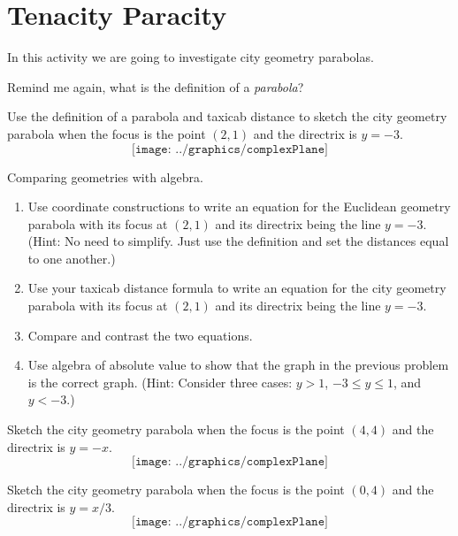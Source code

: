 \newpage
\section{Tenacity Paracity}
In this activity we are going to investigate city geometry parabolas.

\begin{prob} 
Remind me again, what is the definition of a \textit{parabola}?
\end{prob}
\vspace{0.5in}

\begin{prob}
Use the definition of a parabola and taxicab distance to sketch the city geometry parabola when the focus is the point $(2,1)$
and the directrix is $y=-3$. 
\[
\texttt{[image: ../graphics/complexPlane]}
\]
\end{prob}

\break
\begin{prob}
Comparing geometries with algebra. 
\begin{enumerate}
\item Use coordinate constructions to write an equation for the Euclidean geometry parabola with its focus at $(2,1)$ and its directrix being the line $y=-3$.  (Hint:  No need to simplify.  Just use the definition and set the distances equal to one another.)  
\vspace{0.5in}
\item Use your taxicab distance formula to write an equation for the city geometry parabola with its focus at $(2,1)$ and its directrix being the line $y=-3$.  
\vspace{0.5in}
\item Compare and contrast the two equations.  
\vspace{0.5in}
\item Use algebra of absolute value to show that the graph in the previous problem is the correct graph. 
 (Hint:  Consider three cases: $y>1$, $-3\leq y \leq 1$, and $y<-3$.)
\vfill
\end{enumerate}
\end{prob}

\break

\begin{prob}
Sketch the city geometry parabola when the focus is the point $(4,4)$
and the directrix is $y=-x$.
\[
\texttt{[image: ../graphics/complexPlane]}
\]
\end{prob}

\break

\begin{prob}
Sketch the city geometry parabola when the focus is the point $(0,4)$
and the directrix is $y=x/3$.
\[
\texttt{[image: ../graphics/complexPlane]}
\]
\end{prob}

